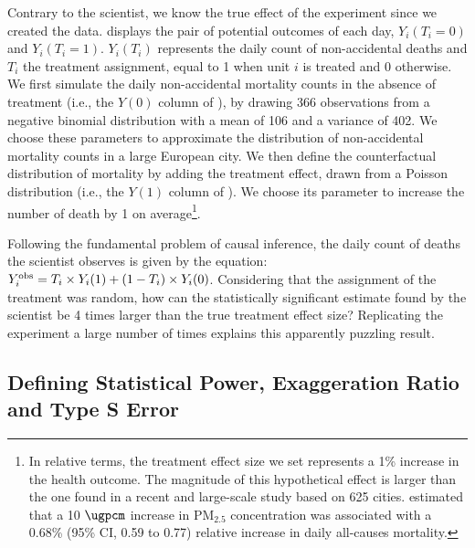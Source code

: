 \documentclass[12pt]{article}
\begin{document}
    Contrary to the scientist, we know the true effect of the experiment since we created the data.  displays the pair of potential outcomes of each day, $Y_{i}(T_{i}=0)$ and $Y_{i}(T_{i}=1)$. $Y_{i}(T_{i})$ represents the daily count of non-accidental deaths and $T_{i}$ the treatment assignment, equal to 1 when unit $i$ is treated and 0 otherwise. We first simulate the daily non-accidental mortality counts in the absence of treatment (i.e., the $Y(0)$ column of ), by drawing 366 observations from a negative binomial distribution with a mean of 106 and a variance of 402. We choose these parameters to approximate the distribution of non-accidental mortality counts in a large European city. We then define the counterfactual distribution of mortality by adding the treatment effect, drawn from a Poisson distribution (i.e., the $Y(1)$ column of ). We choose its parameter to increase the number of death by 1 on average\footnote{In relative terms, the treatment effect size we set represents a 1\% increase in the health outcome. The magnitude of this hypothetical effect is larger than the one found in a recent and large-scale study based on 625 cities. \cite{liu_ambient_2019} estimated that a 10 $\si{\ugpcm}$ increase in $\text{PM}_{2.5}$ concentration was associated with a 0.68\% (95\% CI, 0.59 to 0.77) relative increase in daily all-causes mortality.}.

    

    Following the fundamental problem of causal inference, the daily count of deaths the scientist observes is given by the equation: $Y_{i}^{\textnormal{obs}} = T_{i} \times Y_{i}(1) + (1-T_{i})\times Y_{i}(0)$. Considering that the assignment of the treatment was random, how can the statistically significant estimate found by the scientist be 4 times larger than the true treatment effect size? Replicating the experiment a large number of times explains this apparently puzzling result.
   
        \begin{sloppypar}
    \subsection{Defining Statistical Power, Exaggeration Ratio and Type S Error}
        \end{sloppypar}
\end{document}
